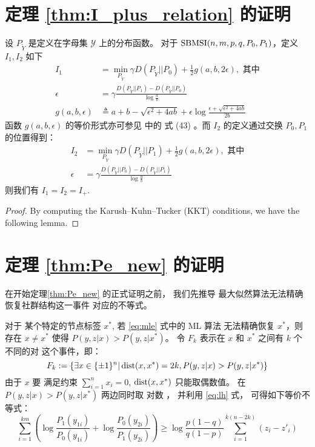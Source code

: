 \section{定理 \ref{thm:I_plus_relation} 的证明}
	\begin{lemma}\label{lem:p0p12}
        设 $P_{\widetilde{Y}}$ 是定义在字母集
        $\mathcal{Y}$ 上的分布函数。
		对于 $\operatorname{SBMSI}(n,m,p,q,P_0,P_1)$，定义
        $I_1, I_2$ 如下
		\begin{align}
			I_1 &=\min_{P_{\widetilde{Y}}} \gamma D(P_{\widetilde{Y}}|| P_0)+ \frac{1}{2} g(a,b, 2\epsilon),
            \text{ 其中}\nonumber\\
			\epsilon &= \gamma \frac{D(P_{\widetilde{Y}} || P_1) - D(P_{\widetilde{Y}} || P_0) }{\log \frac{a}{b}}\label{eq:I1}\\
	   g(a,b,\epsilon) &\triangleq a + b - \sqrt{\epsilon^2 + 4ab} + \epsilon \log \frac{\epsilon + \sqrt{\epsilon^2 + 4ab}}{2b}
       \label{equation:g}
		\end{align}
        函数 $g(a,b,\epsilon)$ 的等价形式亦可参见 \citet{abbe2015exact} 中的 式 (43)
        。而 $I_2$ 的定义通过交换 $P_0, P_1$ 的位置得到：
		\begin{align}
			I_2 & = \min_{P_{\widetilde{Y}}} \gamma D(P_{\widetilde{Y}}|| P_1)+ \frac{1}{2} g(a,b, 2\epsilon),
            \text{ 其中}\nonumber\\
			\epsilon &= \gamma \frac{D(P_{\widetilde{Y}} || P_0) - D(P_{\widetilde{Y}} || P_1) }{\log \frac{a}{b}}
            \label{eq:I2}
		\end{align}
 		则我们有 $I_1=I_2=I_+$. 
    \end{lemma}
    \begin{proof}
        By computing the Karush–Kuhn–Tucker (KKT) conditions, we have the following lemma. %
    \end{proof}
\section{定理 \ref{thm:Pe_new} 的证明}

在开始定理\ref{thm:Pe_new} 的正式证明之前，
我们先推导
最大似然算法无法精确恢复社群结构这一事件
对应的不等式。

对于
某个特定的节点标签
$x^*$,
若
\eqref{eq:mle} 式中的 ML 算法
无法精确恢复 
$x^*$，则
存在 $x\neq x^*$ 使得 $P(y,z|x) > P(y,z|x^*)$。
令 $F_k$ 表示在 $x$ 和 $x^*$ 之间有 $k$ 个不同的对
这个事件，即：
    \begin{equation}\label{eq:Fk}
    F_k:=\{\exists x \in \{\pm 1\}^n |
    \operatorname{dist}(x, x^*)=2k,
    P(y,z|x) > 
    P(y,z|x^*) \}
    \end{equation}
    由于
    $x$ 要 满足约束
    $\sum_{i=1}^n x_i=0$,
    $\operatorname{dist}(x, x^*)$
    只能取偶数值。
    在
    $P(y,z|x) > P(y,z|x^*)$
    两边同时取
    对数
    ， 并利用
    \eqref{eq:lh} 式，
    可得如下等价不等式：
    \begin{equation}\label{eq:ein}
    \sum_{i=1}^{km}
    \left(\log \frac{P_1(y_{1i})}
    {P_0(y_{1i})}
    + \log \frac{P_0(y_{2i})}
    {P_1(y_{2i})}
    \right)
    \geq \log \frac{p(1-q)}{q(1-p)} \sum_{i=1}^{k(n-2k)}(z_{i} - z'_{i})
    \end{equation}
    
